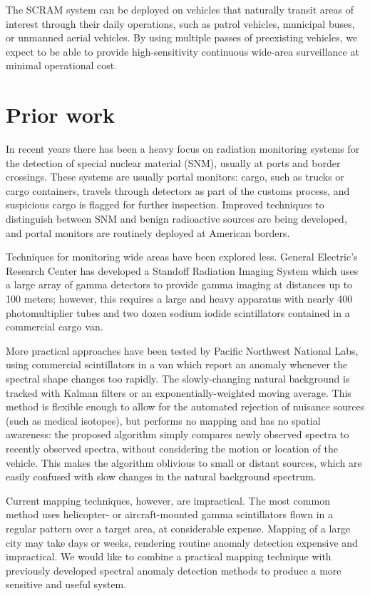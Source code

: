 The SCRAM system can be deployed on vehicles that naturally transit areas of
interest through their daily operations, such as patrol vehicles, municipal
buses, or unmanned aerial vehicles.  By using multiple passes of preexisting
vehicles, we expect to be able to provide high-sensitivity continuous wide-area
surveillance at minimal operational cost.

\section{Prior work}
In recent years there has been a heavy focus on radiation monitoring systems for
the detection of special nuclear material (SNM), usually at ports and border
crossings.\cite{Runkle:2005,Boardman:2012ca} These systems are usually portal
monitors: cargo, such as trucks or cargo containers, travels through detectors
as part of the customs process, and suspicious cargo is flagged for further
inspection. Improved techniques to distinguish between SNM and benign
radioactive sources are being developed, and portal monitors are routinely
deployed at American borders.

Techniques for monitoring wide areas have been explored less. General Electric's
Research Center has developed a Standoff Radiation Imaging System which uses a
large array of gamma detectors to provide gamma imaging at distances up to 100
meters; however, this requires a large and heavy apparatus with nearly 400
photomultiplier tubes and two dozen sodium iodide scintillators contained in a
commercial cargo van.\cite{Zelakiewicz:2011ig} 

More practical approaches have been tested by Pacific Northwest National Labs,
using commercial scintillators in a van which report an anomaly whenever the
spectral shape changes too rapidly.\cite{Pfund:2007,Pfund:2010hm} The
slowly-changing natural background is tracked with Kalman filters or an
exponentially-weighted moving average. This method is flexible enough to allow
for the automated rejection of nuisance sources (such as medical isotopes), but
performs no mapping and has no spatial awareness: the proposed algorithm simply
compares newly observed spectra to recently observed spectra, without
considering the motion or location of the vehicle. This makes the algorithm
oblivious to small or distant sources, which are easily confused with slow
changes in the natural background spectrum.

Current mapping techniques, however, are impractical. The most common method
uses helicopter- or aircraft-mounted gamma scintillators flown in a regular
pattern over a target area, at considerable expense.\cite{Wasiolek:2007vn}
Mapping of a large city may take days or weeks, rendering routine anomaly
detection expensive and impractical. We would like to combine a practical
mapping technique with previously developed spectral anomaly detection methods
to produce a more sensitive and useful system.

